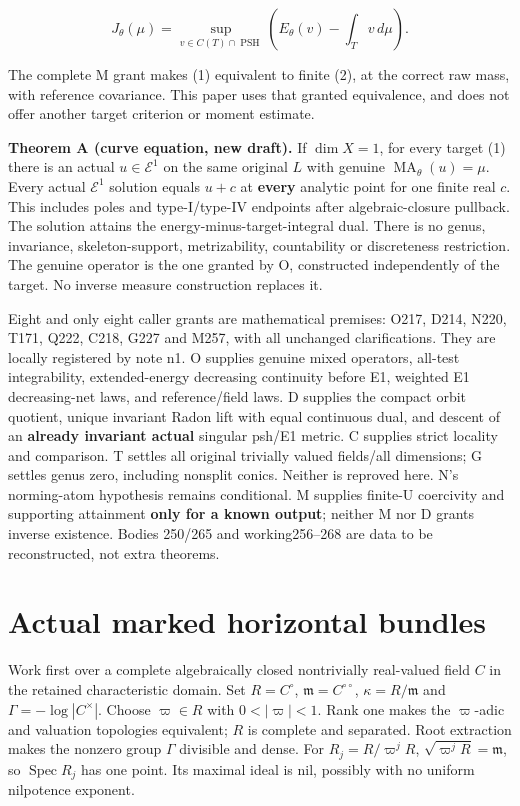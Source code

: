 \documentclass[
  11pt,
]{article}
\begin{document}
\[
 J_\theta(\mu)=\sup_{v\in C(T)\cap\operatorname{PSH}}
       \left(E_\theta(v)-\int_Tv\,d\mu\right).                       \tag{2}
\]

The complete M grant makes (1) equivalent to finite (2), at the correct
raw mass, with reference covariance. This paper uses that granted
equivalence, and does not offer another target criterion or moment
estimate.

\textbf{Theorem A (curve equation, new draft).} If \(\dim X=1\), for
every target (1) there is an actual \(u\in\mathcal E^1\) on the same
original \(L\) with genuine \(\operatorname{MA}_\theta(u)=\mu\). Every
actual \(\mathcal E^1\) solution equals \(u+c\) at \textbf{every}
analytic point for one finite real \(c\). This includes poles and
type-I/type-IV endpoints after algebraic-closure pullback. The solution
attains the energy-minus-target-integral dual. There is no genus,
invariance, skeleton-support, metrizability, countability or
discreteness restriction. The genuine operator is the one granted by O,
constructed independently of the target. No inverse measure construction
replaces it.

Eight and only eight caller grants are mathematical premises: O217,
D214, N220, T171, Q222, C218, G227 and M257, with all unchanged
clarifications. They are locally registered by note n1. O supplies
genuine mixed operators, all-test integrability, extended-energy
decreasing continuity before E1, weighted E1 decreasing-net laws, and
reference/field laws. D supplies the compact orbit quotient, unique
invariant Radon lift with equal continuous dual, and descent of an
\textbf{already invariant actual} singular psh/E1 metric. C supplies
strict locality and comparison. T settles all original trivially valued
fields/all dimensions; G settles genus zero, including nonsplit conics.
Neither is reproved here. N's norming-atom hypothesis remains
conditional. M supplies finite-U coercivity and supporting attainment
\textbf{only for a known output}; neither M nor D grants inverse
existence. Bodies 250/265 and working256--268 are data to be
reconstructed, not extra theorems.

\section{Actual marked horizontal
bundles}\label{actual-marked-horizontal-bundles}

Work first over a complete algebraically closed nontrivially real-valued
field \(C\) in the retained characteristic domain. Set \(R=C^\circ\),
\(\mathfrak m=C^{\circ\circ}\), \(\kappa=R/\mathfrak m\) and
\(\Gamma=-\log|C^\times|\). Choose \(\varpi\in R\) with
\(0<|\varpi|<1\). Rank one makes the \(\varpi\)-adic and valuation
topologies equivalent; \(R\) is complete and separated. Root extraction
makes the nonzero group \(\Gamma\) divisible and dense. For
\(R_j=R/\varpi^jR\), \(\sqrt{\varpi^jR}=\mathfrak m\), so
\(\operatorname{Spec}R_j\) has one point. Its maximal ideal is nil,
possibly with no uniform nilpotence exponent.
\end{document}
